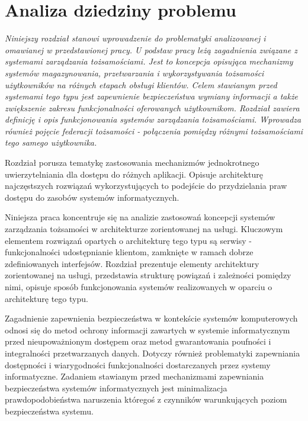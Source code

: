 \chapter{Analiza dziedziny problemu}
\label{cha:analizaDziedzinyProblemu}

{\it
	Niniejszy rozdział stanowi wprowadzenie do problematyki analizowanej i omawianej w przedstawionej pracy. U podstaw pracy leżą zagadnienia związane z  systemami zarządzania tożsamościami. Jest to koncepcja opisująca mechanizmy systemów magazynowania, przetwarzania i wykorzystywania tożsamości użytkowników na różnych etapach obsługi klientów. Celem stawianym przed systemami tego typu jest zapewnienie bezpieczeństwa wymiany informacji a także zwiększenie zakresu funkcjonalności oferowanych użytkownikom. Rozdział zawiera definicję i opis funkcjonowania systemów zarządzania tożsamościami. Wprowadza również pojęcie federacji tożsamości - połączenia pomiędzy różnymi tożsamościami tego samego użytkownika. 

	Rozdział porusza tematykę zastosowania mechanizmów jednokrotnego uwierzytelniania dla dostępu do różnych aplikacji. Opisuje architekturę najczęstszych rozwiązań wykorzystujących to podejście do przydzielania praw dostępu do zasobów systemów informatycznych. 

	Niniejsza praca koncentruje się na analizie zastosowań koncepcji systemów zarządzania tożsamości w architekturze zorientowanej na usługi. Kluczowym elementem rozwiązań opartych o architekturę tego typu są serwisy - funkcjonalności udostępnianie  klientom, zamknięte w ramach dobrze zdefiniowanych interfejsów. Rozdział prezentuje elementy architektury zorientowanej na usługi, przedstawia strukturę powiązań i zależności pomiędzy nimi, opisuje sposób funkcjonowania systemów realizowanych w oparciu o architekturę tego typu. 

}


\label{sec:aspektyBezpieczenstwa}

Zagadnienie zapewnienia bezpieczeństwa w kontekście systemów komputerowych odnosi się do metod ochrony informacji zawartych w systemie informatycznym przed nieupoważnionym dostępem oraz metod gwarantowania poufności i integralności przetwarzanych danych. Dotyczy również problematyki zapewniania dostępności i wiarygodności funkcjonalności dostarczanych przez systemy informatyczne. Zadaniem stawianym przed mechanizmami zapewniania bezpieczeństwa systemów informatycznych jest minimalizacja prawdopodobieństwa naruszenia któregoś z czynników warunkujących poziom bezpieczeństwa systemu. 

